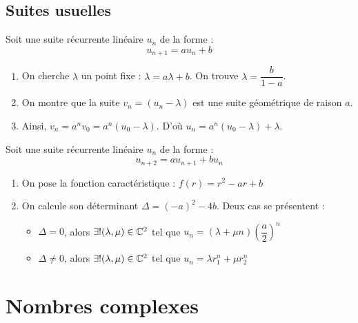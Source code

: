 \documentclass[11pt,a4paper,fleqn,pdftex]{report}
\begin{document}
\section{Suites usuelles} %
\label{sec:suites_usuelles}
\begin{methode}
     Soit une suite récurrente linéaire $u_n$ de la forme : 
     \[
        u_{n+1} = a u_n + b
     \]
     \begin{enumerate}
         \item On cherche $\lambda$ un point fixe : $\lambda = a\lambda + b$. On trouve $\lambda = \dfrac{b}{1 -a}$.
         \item On montre que la suite $v_n = (u_n - \lambda)$ est une suite géométrique de raison $a$.
         \item Ainsi, $v_n = a^n v_0 = a^n (u_0 - \lambda)$. D'où $u_n = a^n (u_0 - \lambda ) + \lambda$.
     \end{enumerate}
Soit une suite récurrente linéaire $u_n$ de la forme : 
     \[
        u_{n+2} = a u_{n+1} + b u_n
     \]
     \begin{enumerate}
         \item On pose la fonction caractéristique : $f(r) = r^2 - a r + b$
         \item On calcule son déterminant $\Delta = (-a)^2 - 4b$. Deux cas se présentent : 
         \begin{itemize}
             \item $\Delta = 0$, alors $\exists ! (\lambda , \mu ) \in \mathbb{C}^2$ tel que $u_n = (\lambda + \mu n)\left( \dfrac{a}{2}\right)^n$
             \item $\Delta \neq 0$, alors $\exists ! (\lambda , \mu ) \in \mathbb{C}^2$ tel que $u_n = \lambda r_1^n + \mu r_2^n $
         \end{itemize}
     \end{enumerate}
\end{methode}
%
\chapter{Nombres complexes} %
\label{cha:nombres_complexes}
\end{document}
